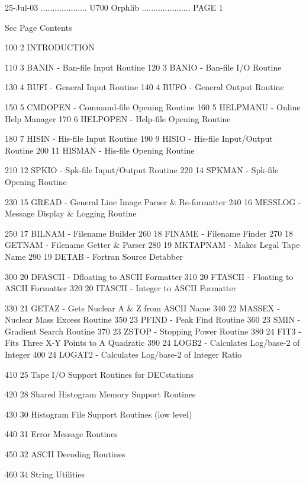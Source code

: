    25-Jul-03 .................... U700  Orphlib ..................... PAGE   1
 
 
   Sec Page Contents
 
   100   2  INTRODUCTION
 
   110   3  BANIN    - Ban-file Input Routine
   120   3  BANIO    - Ban-file I/O   Routine
 
   130   4  BUFI     - General Input  Routine
   140   4  BUFO     - General Output Routine
 
   150   5  CMDOPEN  - Command-file Opening Routine
   160   5  HELPMANU - Online Help Manager
   170   6  HELPOPEN - Help-file Opening Routine
 
   180   7  HISIN    - His-file Input Routine
   190   9  HISIO    - His-file Input/Output Routine
   200  11  HISMAN   - His-file Opening Routine
 
   210  12  SPKIO    - Spk-file Input/Output Routine
   220  14  SPKMAN   - Spk-file Opening Routine
 
   230  15  GREAD    - General Line Image Parser & Re-formatter
   240  16  MESSLOG  - Message Display & Logging Routine
 
   250  17  BILNAM   - Filename Builder
   260  18  FINAME   - Filename Finder
   270  18  GETNAM   - Filename Getter & Parser
   280  19  MKTAPNAM - Makes Legal Tape Name
   290  19  DETAB    - Fortran Source Detabber
 
   300  20  DFASCII  - Dfloating to ASCII Formatter
   310  20  FTASCII  - Floating  to ASCII Formatter
   320  20  ITASCII  - Integer   to ASCII Formatter
 
   330  21  GETAZ    - Gets Nuclear A & Z from ASCII Name
   340  22  MASSEX   - Nuclear Mass Excess Routine
   350  23  PFIND    - Peak Find Routine
   360  23  SMIN     - Gradient Search Routine
   370  23  ZSTOP    - Stopping Power Routine
   380  24  FIT3     - Fits Three X-Y Points to A Quadratic
   390  24  LOGB2    - Calculates Log/base-2 of Integer
   400  24  LOGAT2   - Calculates Log/base-2 of Integer Ratio
 
   410  25  Tape I/O Support Routines for DECstations
 
   420  28  Shared Histogram Memory Support Routines
 
   430  30  Histogram File Support Routines (low level)
 
   440  31  Error Message Routines
 
   450  32  ASCII Decoding Routines
 
   460  34  String Utilities
 
